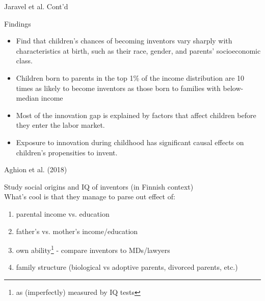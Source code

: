 \begin{frame}{Jaravel et al. Cont'd}
  \begin{block}{Findings}
    \end{block}

  \begin{itemize}
 \item  Find that children’s chances of becoming inventors vary sharply with characteristics at birth, such as their race, gender, and parents’ socioeconomic class. 
  \item  Children born to parents in the top 1\% of the income distribution are
10 times as likely to become inventors as those born to families
with below-median income
\item Most of the innovation gap is explained by factors that affect children before they enter the labor market.
\item Exposure to innovation during childhood has significant causal effects on children’s propensities to invent.

  \end{itemize}
\end{frame}


\begin{frame}{Aghion et al. (2018)}

Study social origins and IQ of inventors (in Finnish context) \\

  What's cool is that they manage to parse out effect of:
\begin{enumerate}
\item parental income vs. education
  \item father's vs. mother's income/education
  \item own ability\footnote{as (imperfectly) measured by IQ tests} - compare inventors to MDs/lawyers
\item family structure (biological vs adoptive parents, divorced parents, etc.)
   
\end{enumerate}

\hyperlink{supplem1}{}

\end{frame}

